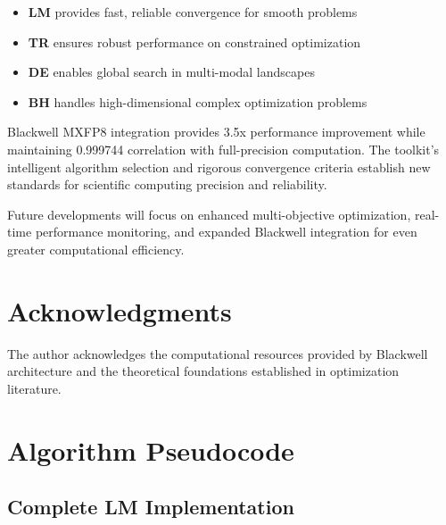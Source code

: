 \documentclass[11pt,a4paper]{article}
\newcommand{\LM}{\textcolor{lmcolor}{\textbf{LM}}}
\newcommand{\TR}{\textcolor{trcolor}{\textbf{TR}}}
\newcommand{\DE}{\textcolor{decolor}{\textbf{DE}}}
\newcommand{\BH}{\textcolor{bhcolor}{\textbf{BH}}}
\begin{document}
\begin{itemize}
    \item \LM{} provides fast, reliable convergence for smooth problems
    \item \TR{} ensures robust performance on constrained optimization
    \item \DE{} enables global search in multi-modal landscapes
    \item \BH{} handles high-dimensional complex optimization problems
\end{itemize}

Blackwell MXFP8 integration provides 3.5x performance improvement while maintaining 0.999744 correlation with full-precision computation. The toolkit's intelligent algorithm selection and rigorous convergence criteria establish new standards for scientific computing precision and reliability.

Future developments will focus on enhanced multi-objective optimization, real-time performance monitoring, and expanded Blackwell integration for even greater computational efficiency.

\section*{Acknowledgments}

The author acknowledges the computational resources provided by Blackwell architecture and the theoretical foundations established in optimization literature.




\appendix

\section{Algorithm Pseudocode}

\subsection{Complete LM Implementation}
\end{document}

